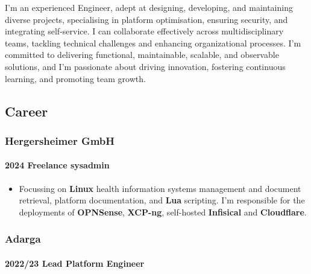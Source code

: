 \documentclass[
]{article}
\providecommand{\tightlist}{%
  \setlength{\itemsep}{0pt}\setlength{\parskip}{0pt}}
\begin{document}
I'm an experienced Engineer, adept at designing, developing, and
maintaining diverse projects, specialising in platform optimisation,
ensuring security, and integrating self-service. I can collaborate
effectively across multidisciplinary teams, tackling technical
challenges and enhancing organizational processes. I'm committed to
delivering functional, maintainable, scalable, and observable solutions,
and I'm passionate about driving innovation, fostering continuous
learning, and promoting team growth.

\hypertarget{material-briefcase-career}{%
\subsection{\texorpdfstring{\faBriefcase
Career}{ Career}}\label{material-briefcase-career}}

\hypertarget{material-office-building-hergersheimer-gmbh}{%
\subsubsection{\texorpdfstring{\faBuilding Hergersheimer
GmbH}{ Hergersheimer GmbH}}\label{material-office-building-hergersheimer-gmbh}}

\hypertarget{freelance-sysadmin}{%
\paragraph{2024 Freelance sysadmin}\label{freelance-sysadmin}}

\begin{itemize}
\tightlist
\item
  Focussing on \textbf{Linux} health information systems management and
  document retrieval, platform documentation, and \textbf{Lua}
  scripting. I'm responsible for the deployments of \textbf{OPNSense},
  \textbf{XCP-ng}, self-hosted \textbf{Infisical} and
  \textbf{Cloudflare}.
\end{itemize}

\hypertarget{material-office-building-adarga}{%
\subsubsection{\texorpdfstring{\faBuilding
Adarga}{ Adarga}}\label{material-office-building-adarga}}

\hypertarget{lead-platform-engineer}{%
\paragraph{2022/23 Lead Platform
Engineer}\label{lead-platform-engineer}}
\end{document}
